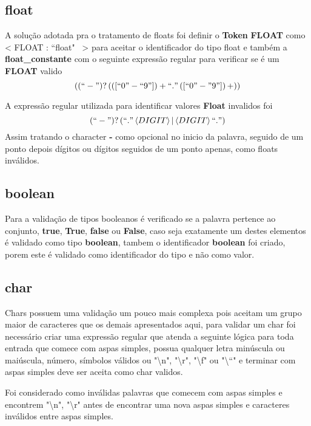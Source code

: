 \documentclass[
	article,			%
	11pt,				%
	oneside,			%
	a4paper,			%
	portuguese,			%
	brazil,				%
	sumario=tradicional
	]{abntex2}
\begin{document}
\subsection{float}

A solução adotada pra o tratamento de floats foi definir o \textbf{Token} \textbf{FLOAT} como < FLOAT : ``float" \ > para aceitar o identificador do tipo float e também a \textbf{float\_constante} com o seguinte expressão regular para verificar se é um \textbf{FLOAT} valido \[ \left( \left( ``-" \right)? \left( \left([``0"-``9"]\right)+ ``." \left([``0"-"9"]\right)+\right) \right) \]

A expressão regular utilizada para identificar valores \textbf{Float} invalidos foi \[ \left( ``-" \right)? \left( ``." \left<DIGIT\right> | \left<DIGIT\right> ``." \right) \]
Assim tratando o character \textbf{-} como opcional no inicio da palavra, seguido de um ponto depois dígitos ou dígitos seguidos de um ponto apenas, como floats inválidos.

\subsection{boolean}

Para a validação de tipos booleanos é verificado se a palavra pertence ao conjunto, \textbf{true}, \textbf{True}, \textbf{false} ou \textbf{False}, caso seja exatamente um destes elementos é validado como tipo \textbf{boolean}, tambem o identificador \textbf{boolean} foi criado, porem este é validado como identificador do tipo e não como valor.

\subsection{char}

Chars possuem uma validação um pouco mais complexa pois aceitam um grupo maior de caracteres que os demais apresentados aqui, para validar um char foi necessário criar uma expressão regular que atenda a seguinte lógica para toda entrada que comece com aspas simples, possua qualquer letra minúscula ou maiúscula, número, símbolos válidos ou 
"\textbackslash n", "\textbackslash r", "\textbackslash f" ou "\textbackslash ``" e terminar com aspas simples deve ser aceita como char validos.

Foi considerado como inválidas palavras que comecem com aspas simples e encontrem "\textbackslash n", "\textbackslash r" antes de encontrar uma nova aspas simples e caracteres inválidos entre aspas simples.
\end{document}
